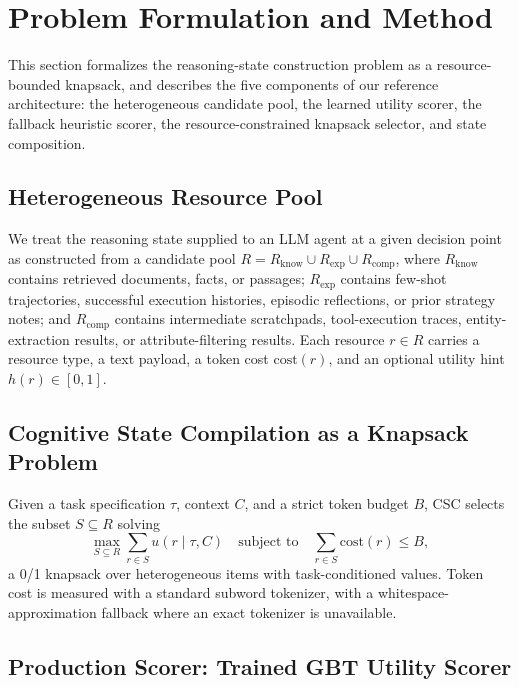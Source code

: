 \documentclass{article}
\begin{document}
\section{Problem Formulation and Method}

This section formalizes the reasoning-state construction problem as a resource-bounded knapsack, and describes the five components of our reference architecture: the heterogeneous candidate pool, the learned utility scorer, the fallback heuristic scorer, the resource-constrained knapsack selector, and state composition.

\subsection{Heterogeneous Resource Pool}

We treat the reasoning state supplied to an LLM agent at a given decision point as constructed from a candidate pool $R = R_{\text{know}} \cup R_{\text{exp}} \cup R_{\text{comp}}$, where $R_{\text{know}}$ contains retrieved documents, facts, or passages; $R_{\text{exp}}$ contains few-shot trajectories, successful execution histories, episodic reflections, or prior strategy notes; and $R_{\text{comp}}$ contains intermediate scratchpads, tool-execution traces, entity-extraction results, or attribute-filtering results. Each resource $r \in R$ carries a resource type, a text payload, a token cost $\text{cost}(r)$, and an optional utility hint $h(r) \in [0,1]$.

\subsection{Cognitive State Compilation as a Knapsack Problem}

Given a task specification $\tau$, context $C$, and a strict token budget $B$, CSC selects the subset $S \subseteq R$ solving
\begin{equation}
\max_{S \subseteq R} \sum_{r \in S} u(r \mid \tau, C) \quad \text{subject to} \quad \sum_{r \in S} \text{cost}(r) \leq B,
\end{equation}
a 0/1 knapsack over heterogeneous items with task-conditioned values. Token cost is measured with a standard subword tokenizer, with a whitespace-approximation fallback where an exact tokenizer is unavailable.

\subsection{Production Scorer: Trained GBT Utility Scorer}
\end{document}
